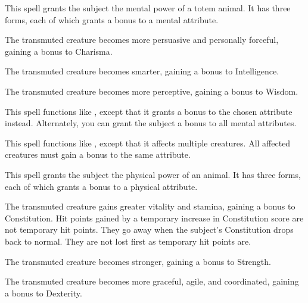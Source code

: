 \spellrng{\rngtouch}
\spelldur{\durshort}
\begin{spelleffect}
  This spell grants the subject the mental power of a totem animal. It has three forms, each of which grants a  bonus to a mental attribute.
  \par {} The transmuted creature becomes more persuasive and personally forceful, gaining a bonus to Charisma.
  \par {} The transmuted creature becomes smarter, gaining a bonus to Intelligence.
  \par {} The transmuted creature becomes more perceptive, gaining a bonus to Wisdom.
\end{spelleffect}

\begin{spelleffect}
    This spell functions like , except that it grants a  bonus to the chosen attribute instead. Alternately, you can grant the subject a  bonus to all mental attributes.
\end{spelleffect}

\spellrng{\rngmed}
\begin{spelleffect}
  This spell functions like , except that it affects multiple creatures. All affected creatures must gain a bonus to the same attribute.
\end{spelleffect}

\spellrng{\rngtouch}
\spelldur{\durshort}
\begin{spelleffect}
  This spell grants the subject the physical power of an animal. It has three forms, each of which grants a  bonus to a physical attribute.
  \par {} The transmuted creature gains greater vitality and stamina, gaining a bonus to Constitution. Hit points gained by a temporary increase in Constitution score are not temporary hit points. They go away when the subject's Constitution drops back to normal. They are not lost first as temporary hit points are.
  \par {} The transmuted creature becomes stronger, gaining a bonus to Strength.
  \par {} The transmuted creature becomes more graceful, agile, and coordinated, gaining a bonus to Dexterity.
\end{spelleffect}

